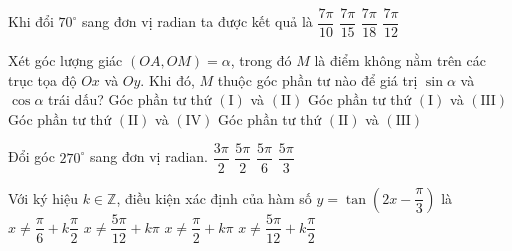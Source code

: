 \begin{ex}%
	Khi đổi $70^{\circ}$  sang đơn vị radian ta được kết quả là
	\choice 
		 {$\dfrac{7\pi}{10}$}
		 {$\dfrac{7\pi}{15}$}
		{\True  $\dfrac{7\pi}{18}$}
		{$\dfrac{7\pi}{12}$} 
\end{ex}

\begin{ex}%
	Xét góc lượng giác $(OA,OM)=\alpha$, trong đó $M$ là điểm không nằm trên các trục tọa độ $Ox$  và $Oy$. Khi đó, $M$ thuộc góc phần tư nào để giá trị $\sin \alpha$ và $\cos \alpha$ trái dấu?
	\choice 
		{Góc phần tư thứ  $(\text{I})$ và $(\text{II})$}
		{Góc phần tư thứ $(\text{I})$ và $(\text{III})$} 
		{\True Góc phần tư  thứ $(\text{II})$ và $(\text{IV})$}
		{Góc phần  tư thứ $(\text{II})$ và $(\text{III})$}
\end{ex}

\begin{ex}%
	Đổi góc $270^\circ$ sang đơn  vị radian.
	\choice 
		{\True  $\dfrac{3\pi}{2} $}
		 {$\dfrac{5\pi}{2} $}
		{$\dfrac{5\pi}{6} $} 
		 {$\dfrac{5\pi}{3} $}
\end{ex}

\begin{ex}%
	Với ký hiệu $k \in \mathbb{Z}$, điều kiện xác  định của hàm số $y=\tan \left(2x-\dfrac{\pi}{3}\right)$ là
	\choice 
		 {$x\ne \dfrac{\pi}{6}+k\dfrac{\pi}{2}$}
		 {$x\ne \dfrac{5\pi}{12}+k\pi $}
		{$x\ne \dfrac{\pi}{2}+k\pi  $}
		{\True $x\ne \dfrac{5\pi}{12}+k\dfrac{\pi}{2}$} 
\end{ex}


